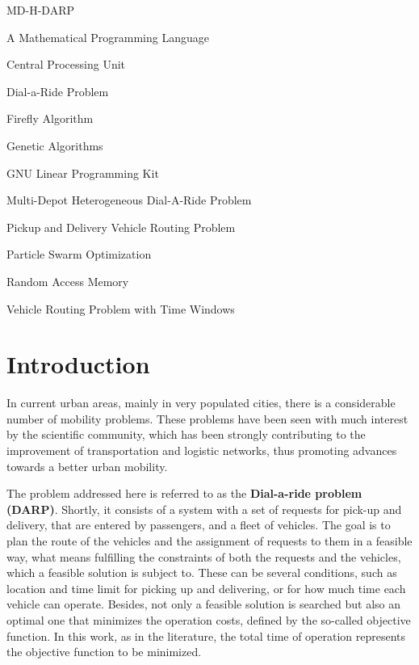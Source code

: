 \documentclass[tuberlin,cic,tc,openright,english,noabntcite,oneside]{iiufrgs}
\begin{document}
\begin{listofabbrv}{MD-H-DARP}
	\item[AMPL] A Mathematical Programming Language
	\item[CPU] Central Processing Unit
    \item[DARP] Dial-a-Ride Problem
    \item[FA] Firefly Algorithm
    \item[GA] Genetic Algorithms
    \item[GLPK] GNU Linear Programming Kit
    \item[MD-H-DARP] Multi-Depot Heterogeneous Dial-A-Ride Problem
    \item[PDVRP] Pickup and Delivery Vehicle Routing Problem
    \item[PSO] Particle Swarm Optimization
    \item[RAM] Random Access Memory
    \item[VRPTW] Vehicle Routing Problem with Time Windows
\end{listofabbrv}


\tableofcontents


\chapter{Introduction}
In current urban areas, mainly in very populated cities, there is a considerable number of mobility problems. These problems have been seen with much interest by the scientific community, which has been strongly contributing to the improvement of transportation and logistic networks, thus promoting advances towards a better urban mobility.

The problem addressed here is referred to as the \textbf{Dial-a-ride problem (DARP)}. Shortly, it consists of a system with a set of requests for pick-up and delivery, that are entered by passengers, and a fleet of vehicles. The goal is to plan the route of the vehicles and the assignment of requests to them in a feasible way, what means fulfilling the constraints of both the requests and the vehicles, which a feasible solution is subject to. These can be several conditions, such as location and time limit for picking up and delivering, or for how much time each vehicle can operate. Besides, not only a feasible solution is searched but also an optimal one that minimizes the operation costs, defined by the so-called objective function. In this work, as in the literature, the total time of operation represents the objective function to be minimized.
\end{document}
